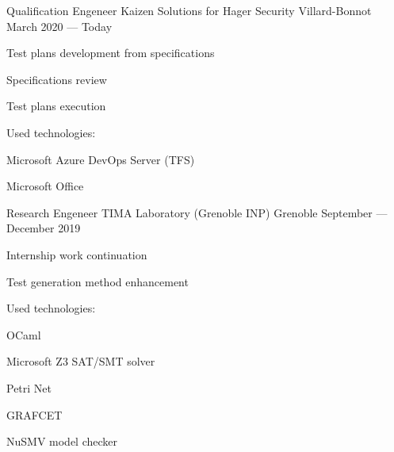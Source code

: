 


\begin{cventries}


\cventry
{Qualification Engeneer} %
{Kaizen Solutions for Hager Security} %
{Villard-Bonnot} %
{March 2020 --- Today} %
{ %
  \begin{cvitems}
  \item Test plans development from specifications
  \item Specifications review
  \item Test plans execution
  \item Used technologies:
    \vspace{.4cm}
    \begin{cvitems}
    \item Microsoft Azure DevOps Server (TFS)
    \item Microsoft Office
    \end{cvitems}
    \vspace{.4cm}
  \end{cvitems}
}

\cventry
{Research Engeneer} %
{TIMA Laboratory (Grenoble INP)} %
{Grenoble} %
{September --- December 2019} %
{ %
\begin{cvitems}
\item Internship work continuation
\item Test generation method enhancement
\item Used technologies:
  \vspace{.4cm}
  \begin{cvitems}
    \item OCaml
    \item Microsoft Z3 SAT/SMT solver
    \item Petri Net
    \item GRAFCET
    \item NuSMV model checker
  \end{cvitems}
\end{cvitems}
}


\end{cventries}
